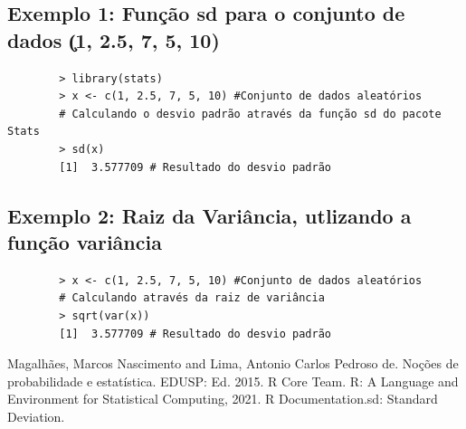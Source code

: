 \documentclass[12pt,a4paper]{article}
\begin{document}
	\subsection*{Exemplo 1: Função sd para o conjunto de dados \c(1, 2.5, 7, 5, 10)}

	\begin{verbatim}
		> library(stats)
		> x <- c(1, 2.5, 7, 5, 10) #Conjunto de dados aleatórios
		# Calculando o desvio padrão através da função sd do pacote Stats
		> sd(x)
		[1]  3.577709 # Resultado do desvio padrão
	\end{verbatim}
	
	\subsection*{Exemplo 2: Raiz da Variância, utlizando a função variância}
	
	\begin{verbatim}
		> x <- c(1, 2.5, 7, 5, 10) #Conjunto de dados aleatórios
		# Calculando através da raiz de variância
		> sqrt(var(x))
		[1]  3.577709 # Resultado do desvio padrão
		\end{verbatim}

	
	
	\begin{thebibliography}{100}
		
		 Magalhães, Marcos Nascimento and Lima, Antonio Carlos Pedroso de. Noções de probabilidade e estatística. EDUSP: Ed. 2015.
		 R Core Team. R: A Language and Environment for Statistical Computing, 2021.
		 R Documentation.sd: Standard Deviation.
	\end{thebibliography}
	
\end{document}

